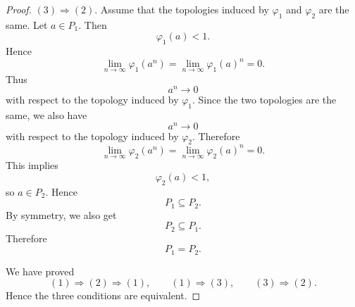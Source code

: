 \begin{proof}
    \((3)\Rightarrow (2)\).
    Assume that the topologies induced by \(\varphi_1\) and \(\varphi_2\) are the same.
    Let \(a\in P_1\). Then
    \[
        \varphi_1(a)<1.
    \]
    Hence
    \[
        \lim_{n\to\infty}\varphi_1(a^n)
        =
        \lim_{n\to\infty}\varphi_1(a)^n
        =
        0.
    \]
    Thus
    \[
        a^n\longrightarrow 0
    \]
    with respect to the topology induced by \(\varphi_1\). Since the two topologies are
    the same, we also have
    \[
        a^n\longrightarrow 0
    \]
    with respect to the topology induced by \(\varphi_2\). Therefore
    \[
        \lim_{n\to\infty}\varphi_2(a^n)
        =
        \lim_{n\to\infty}\varphi_2(a)^n
        =
        0.
    \]
    This implies
    \[
        \varphi_2(a)<1,
    \]
    so \(a\in P_2\). Hence
    \[
        P_1\subseteq P_2.
    \]
    By symmetry, we also get
    \[
        P_2\subseteq P_1.
    \]
    Therefore
    \[
        P_1=P_2.
    \]

    We have proved
    \[
        (1)\Rightarrow (2)\Rightarrow (1),
        \qquad
        (1)\Rightarrow (3),
        \qquad
        (3)\Rightarrow (2).
    \]
    Hence the three conditions are equivalent.
\end{proof}

